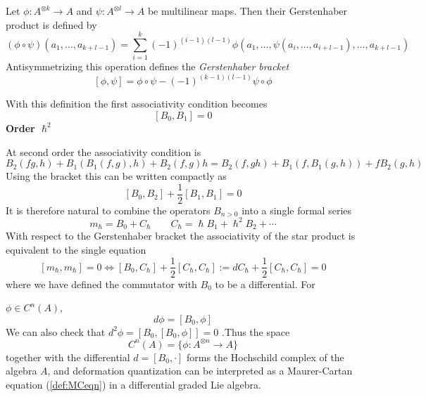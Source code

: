 \documentclass[
  12pt,
  a4paper, oneside
]{report}
\renewcommand{\hbar}{\hslash}
\theoremstyle{bolddef}
\theoremstyle{remark}
\numberwithin{equation}{chapter}
\begin{document}
Let $\phi:A^{\otimes k}\to A$ and $\psi:A^{\otimes l}\to A$ be multilinear
maps. Then their Gerstenhaber product is defined by
\[
(\phi\circ\psi)(a_1,\dots,a_{k+l-1})
=
\sum_{i=1}^{k}
(-1)^{(i-1)(l-1)}
\phi(a_1,\dots,\psi(a_i,\dots,a_{i+l-1}),\dots,a_{k+l-1})
\]
Antisymmetrizing this operation defines the \emph{Gerstenhaber bracket}
\[
[\phi,\psi]
=
\phi\circ\psi
-
(-1)^{(k-1)(l-1)}\psi\circ\phi 
\]

With this definition the first associativity condition becomes 
\[
[B_0,B_1]=0
\]
\textbf{Order $\symbf{\hbar}^2$}

At second order the associativity condition is
\[
B_2(fg,h)+B_1(B_1(f,g),h)+B_2(f,g)h
=
B_2(f,gh)+B_1(f,B_1(g,h))+fB_2(g,h)
\]
Using the bracket this can be written compactly as
\[
[B_0,B_2]+\frac{1}{2}[B_1,B_1]=0
\]
It is therefore natural to combine the operators $B_{n>0}$ into a single formal
series
\[
m_\hbar=B_0+ C_{\hbar} \qquad C_{\hbar} = \hbar B_{1} + \hbar^{2}B_{2} + \cdots
\]
With respect to the Gerstenhaber bracket the associativity of the star
product is equivalent to the single equation
\[
  [m_\hbar,m_\hbar]=0 \iff [B_{0},C_{\hbar}] + \frac{1}{2}[C_{\hbar},C_{\hbar}] := dC_{\hbar} + \frac{1}{2}[C_{\hbar},C_{\hbar}] = 0
\]
where we have defined the commutator with $B_0$ 
to be a differential. For 

$\phi\in C^n(A)$,
\[
d\phi=[B_0,\phi]
\]
We can also check that 
$d^{2}\phi = [B_0,[B_0,\phi]]=0$
.Thus the space
\[
C^n(A)=\{\phi:A^{\otimes n}\to A\}
\]
together with the differential $d=[B_0,\cdot]$ forms the
Hochschild complex of the algebra $A$, and deformation quantization can be interpreted as a Maurer-Cartan
equation (\ref{def:MCeqn}) in a differential graded Lie algebra. 
\bigskip
\end{document}
